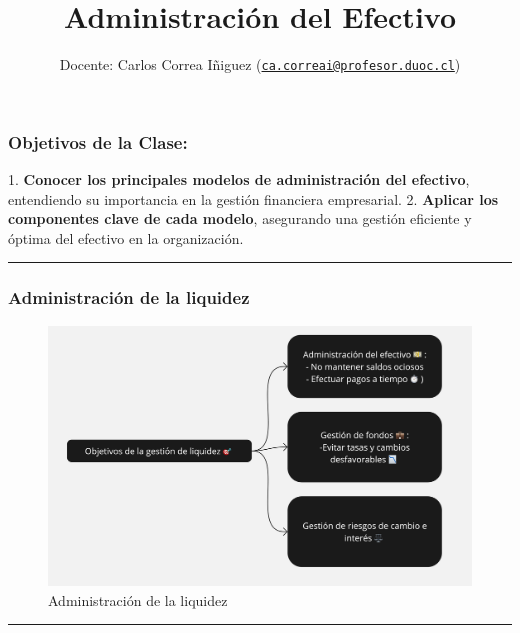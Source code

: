 \documentclass[
  letterpaper,
  DIV=11,
  numbers=noendperiod]{scrartcl}
\title{Administración del Efectivo}
\author{Docente: Carlos Correa Iñiguez
(\href{mailto:ca.correai@profesor.duoc.cl}{\nolinkurl{ca.correai@profesor.duoc.cl}})}
\date{}
\begin{document}
\maketitle


\subsubsection{Objetivos de la Clase:}\label{objetivos-de-la-clase}

1. \textbf{Conocer los principales modelos de administración del
efectivo}, entendiendo su importancia en la gestión financiera
empresarial. 2. \textbf{Aplicar los componentes clave de cada modelo},
asegurando una gestión eficiente y óptima del efectivo en la
organización.

\begin{center}\rule{0.5\linewidth}{0.5pt}\end{center}

\subsubsection{Administración de la
liquidez}\label{administraciuxf3n-de-la-liquidez}

\begin{figure}[H]

{\centering \includegraphics{Imagen2.png}

}

\caption{Administración de la liquidez}

\end{figure}%

\begin{center}\rule{0.5\linewidth}{0.5pt}\end{center}
\end{document}
